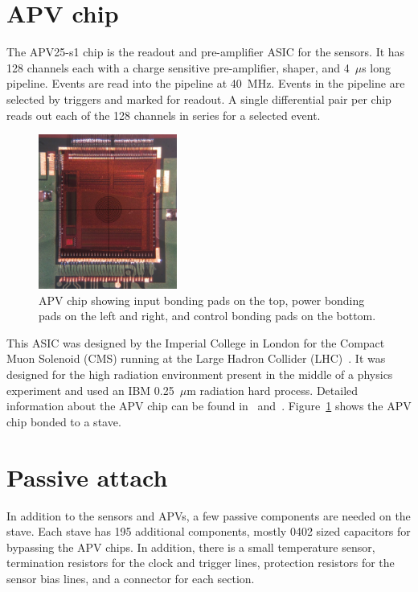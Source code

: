 \documentclass[preprint,12pt]{elsarticle}
\begin{document}
\section{APV chip}
The APV25-s1 chip is the readout and pre-amplifier ASIC for the sensors. It has
128 channels each with a charge sensitive pre-amplifier, shaper, and 4~$\mu$s long
pipeline. Events are read into the pipeline at 40~MHz. Events in the pipeline are selected by
triggers and marked for readout. A single differential pair per chip reads out each of
the 128 channels in series for a selected event.

\begin{figure}[ht]
\begin{center}
\includegraphics[height=2in, keepaspectratio=true, angle=0]{graphics/apv_chip.jpg}
\caption{APV chip showing input bonding pads on the top, power bonding pads on
the left and right, and control bonding pads on the bottom.
\label{fig:apv}}
\end{center}
\end{figure}
%
This ASIC was designed by the Imperial College in London for the Compact Muon
Solenoid (CMS) running at the Large Hadron Collider (LHC)~\cite{ref:apv_nim}. It was designed
for the high radiation environment present in the middle of a physics experiment
and used an IBM 0.25~$\mu$m radiation hard process. Detailed information about the
APV chip can be found in~\cite{ref:apv} and~\cite{ref:apv_nim}.  Figure~\ref{fig:apv} shows the APV 
chip bonded to a stave.

\section{Passive attach}
In addition to the sensors and APVs, a few passive components are needed on the stave.
Each stave has 195 additional components, mostly 0402 sized capacitors for
bypassing the APV chips. In addition, there is a small temperature sensor,
termination resistors for the clock and trigger lines, protection resistors for
the sensor bias lines, and a connector for each section.
\end{document}
